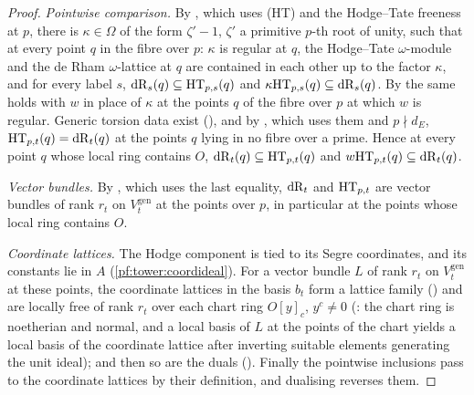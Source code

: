 \begin{proof}
\emph{Pointwise comparison.} By , which uses (HT) and the
Hodge--Tate freeness at $p$, there is $\kappa\in\Omega$ of the form $\zeta'-1$, $\zeta'$ a primitive $p$-th root of unity, such
that at every point $q$ in the fibre over $p$: $\kappa$ is regular at $q$, the Hodge--Tate $\omega$-module and the de Rham
$\omega$-lattice at $q$ are contained in each other up to the factor $\kappa$, and for every label $s$,
$\mathrm{dR}_s(q)\subseteq\mathrm{HT}_{p,s}(q)$ and $\kappa\mathrm{HT}_{p,s}(q)\subseteq\mathrm{dR}_s(q)$. By
 the same holds with $w$ in place of $\kappa$ at the points $q$ of the
fibre over $p$ at which $w$ is regular. Generic torsion data exist (),
and by , which uses them and $p\nmid d_E$,
$\mathrm{HT}_{p,t}(q)=\mathrm{dR}_t(q)$ at the points $q$ lying in no fibre over a prime. Hence at every point $q$ whose local ring
contains $O$, $\mathrm{dR}_t(q)\subseteq\mathrm{HT}_{p,t}(q)$ and $w\mathrm{HT}_{p,t}(q)\subseteq\mathrm{dR}_t(q)$.

\emph{Vector bundles.} By , which uses the last equality, $\mathrm{dR}_t$ and
$\mathrm{HT}_{p,t}$ are vector bundles of rank $r_t$ on $V^{\mathrm{gen}}_t$ at the points over $p$, in particular at the points whose
local ring contains $O$.

\emph{Coordinate lattices.} The Hodge component is tied to its Segre coordinates, and its constants lie in $A$
(\cref{pf:tower:coordideal}). For a vector bundle $L$ of rank $r_t$ on $V^{\mathrm{gen}}_t$ at these points, the coordinate lattices
in the basis $b_t$ form a lattice family () and are locally
free of rank $r_t$ over each chart ring $O[y]_c$, $y^c\ne0$
(: the chart ring is noetherian and normal, and a local
basis of $L$ at the points of the chart yields a local basis of the coordinate lattice after inverting suitable elements generating
the unit ideal); and then so are the duals (). Finally the pointwise inclusions
pass to the coordinate lattices by their definition, and dualising reverses them.
\end{proof}

